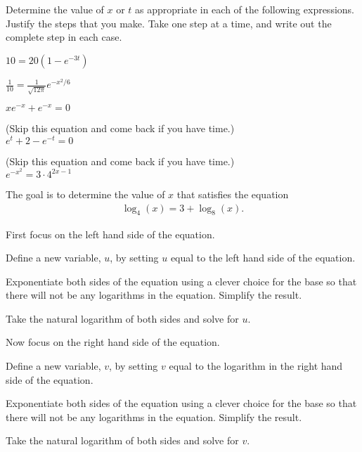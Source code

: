 \begin{problem}
\item Determine the value of $x$ or $t$ as appropriate in each of the
  following expressions. Justify the steps that you make. Take one
  step at a time, and write out the complete step in each case.
  \begin{subproblem}
  \item $10 = 20\left( 1 - e^{-3t} \right)$

    \vfill

  \item $\frac{1}{10} =  \frac{1}{\sqrt{12\pi}} e^{-x^2/6}$
    \vfill
  \item $xe^{-x} + e^{-x} = 0$
    \vfill
    \clearpage
  \item (Skip this equation and come back if you have time.) \\
    $e^{t} + 2 - e^{-t} = 0$
    \vfill
  \item (Skip this equation and come back if you have time.) \\
    $e^{-x^2} = 3\cdot 4^{2x-1}$
    \vfill
  \end{subproblem}

  \clearpage

\item The goal is to determine the value of $x$ that satisfies the
  equation
  \begin{eqnarray*}
    \log_4(x) = 3 + \log_8(x).
  \end{eqnarray*}
  \vspace{-2em}
  \begin{subproblem}
  \item First focus on the left hand side of the equation.
    \begin{subsubproblem}
    \item Define a new variable, $u$, by setting $u$ equal to the left
      hand side of the equation.
      \vfill
    \item Exponentiate both sides of the equation using a clever
      choice for the base so that there will not be any logarithms in
      the equation. Simplify the result.
      \vfill
      \vfill
    \item Take the natural logarithm of both sides and solve for $u$.
      \vfill
      \vfill
    \end{subsubproblem}

  \item Now focus on the right hand side of the equation.
    \begin{subsubproblem}
    \item Define a new variable, $v$, by setting $v$ equal to the
      logarithm in the right hand side of the equation.
      \vfill
    \item Exponentiate both sides of the equation using a clever
      choice for the base so that there will not be any logarithms in
      the equation. Simplify the result.
      \vfill
      \vfill
    \item Take the natural logarithm of both sides and solve for $v$.
      \vfill
      \vfill
    \end{subsubproblem}
    \clearpage
    

\end{subproblem}
\end{problem}
